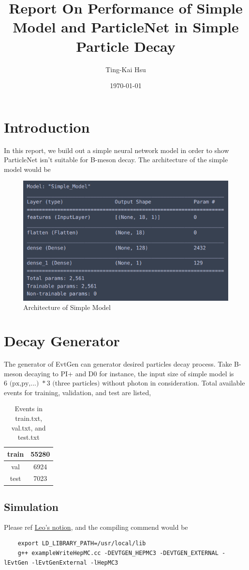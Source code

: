 \documentclass[12pt]{article}
\title{Report On Performance of Simple Model and ParticleNet in Simple Particle Decay}
\author{Ting-Kai Hsu}
\date{\today}
\numberwithin{equation}{section}
\begin{document}
\maketitle
\tableofcontents
\section{Introduction}
In this report, we build out a simple neural network model in order to show ParticleNet\cite{Qu:2019gqs} isn't suitable for B-meson decay.
The architecture of the simple model would be
\begin{figure}[H]
    \centering
    \includegraphics[width=0.75\linewidth]{Screenshot from 2024-06-22 00-15-47.png}
    \caption{Architecture of Simple Model}
    \label{1}
\end{figure}
\section{Decay Generator}
The generator of EvtGen can generator desired particles decay process.
Take B-meson decaying to PI+ and D0 for instance, the input size of simple model is $6\text{ (px,py,...) }*3\text{ (three particles)}$ without photon in consideration.
Total available events for training, validation, and test are listed,
\begin{table}[H]
    \centering
    \caption{Events in train.txt, val.txt, and test.txt}
        \begin{tabular}{|c|c|}
        \hline
        train & 55280\\
        \hline
        val & 6924\\
        \hline
        test & 7023\\
        \hline
        \end{tabular}
    \label{label}
\end{table}
\subsection{Simulation}
Please ref \href{https://www.notion.so/Setting-Up-the-Environment-of-EvtGen-7d07a52f8ac642f6bb118970e75a1deeURL}{Leo's notion}, and the compiling commend would be
\begin{lstlisting}
    export LD_LIBRARY_PATH=/usr/local/lib
    g++ exampleWriteHepMC.cc -DEVTGEN_HEPMC3 -DEVTGEN_EXTERNAL -lEvtGen -lEvtGenExternal -lHepMC3
\end{lstlisting}
\end{document}
